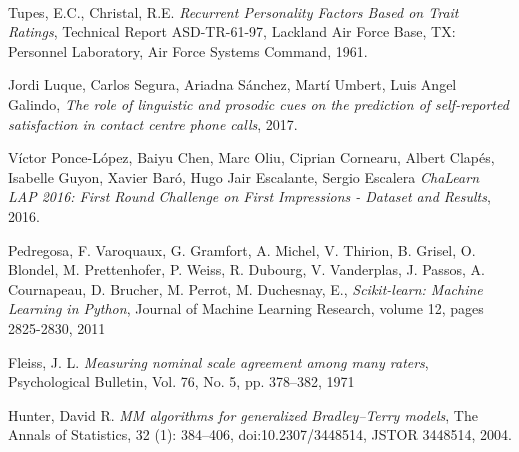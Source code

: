 \documentclass[12pt,a4paper]{report}
\begin{document}
\paragraph{} 

\begin{appendix}
  \listoffigures
  \listoftables
\end{appendix}

\begin{thebibliography}{9}

Tupes, E.C., Christal, R.E.
\emph{Recurrent Personality Factors Based on Trait Ratings}, Technical Report ASD-TR-61-97,
Lackland Air Force Base,
TX: Personnel Laboratory,
Air Force Systems Command,
1961.

  Jordi Luque, Carlos Segura, Ariadna Sánchez, Martí Umbert, Luis Angel Galindo,
  \textit{The role of linguistic and prosodic cues on the prediction of self-reported satisfaction in contact centre phone calls},
  2017.

	Víctor Ponce-López, Baiyu Chen, Marc Oliu, Ciprian Cornearu, Albert Clapés, Isabelle Guyon, Xavier Baró, Hugo Jair Escalante, Sergio Escalera
	\textit{ChaLearn LAP 2016: First Round Challenge on First Impressions - Dataset and Results},
	2016.
	
Pedregosa, F. Varoquaux, G. Gramfort, A. Michel, V.
         Thirion, B. Grisel, O. Blondel, M. Prettenhofer, P.
         Weiss, R. Dubourg, V. Vanderplas, J. Passos, A.
         Cournapeau, D. Brucher, M. Perrot, M. Duchesnay, E.,
\emph{Scikit-learn: Machine Learning in Python},
Journal of Machine Learning Research,
volume 12,
pages 2825-2830,
2011

Fleiss, J. L. 
\emph{Measuring nominal scale agreement among many raters},
Psychological Bulletin, 
Vol. 76,
No. 5,
pp. 378–382,
1971

Hunter, David R.
\emph{MM algorithms for generalized Bradley–Terry models},
The Annals of Statistics,
32 (1): 384–406,
doi:10.2307/3448514,
JSTOR 3448514,
2004.

\end{thebibliography}
\end{document}
